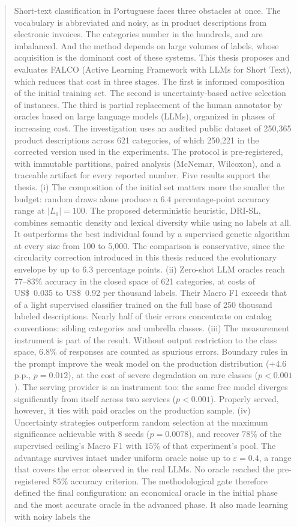 \begin{abstract}

Short-text classification in Portuguese faces three obstacles at once. The vocabulary is abbreviated and noisy, as in product descriptions from electronic invoices. The categories number in the hundreds, and are imbalanced. And the method depends on large volumes of labels, whose acquisition is the dominant cost of these systems. This thesis proposes and evaluates FALCO (Active Learning Framework with LLMs for Short Text), which reduces that cost in three stages. The first is informed composition of the initial training set. The second is uncertainty-based active selection of instances. The third is partial replacement of the human annotator by oracles based on large language models (LLMs), organized in phases of increasing cost. The investigation uses an audited public dataset of 250,365 product descriptions across 621 categories, of which 250,221 in the corrected version used in the experiments. The protocol is pre-registered, with immutable partitions, paired analysis (McNemar, Wilcoxon), and a traceable artifact for every reported number. Five results support the thesis. (i) The composition of the initial set matters more the smaller the budget: random draws alone produce a $6.4$ percentage-point accuracy range at $|L_0|=100$. The proposed deterministic heuristic, DRI-SL, combines semantic density and lexical diversity while using no labels at all. It outperforms the best individual found by a supervised genetic algorithm at every size from 100 to 5,000. The comparison is conservative, since the circularity correction introduced in this thesis reduced the evolutionary envelope by up to $6.3$ percentage points. (ii) Zero-shot LLM oracles reach $77$--$83\%$ accuracy in the closed space of 621 categories, at costs of US\$~0.035 to US\$~0.92 per thousand labels. Their Macro F1 exceeds that of a light supervised classifier trained on the full base of 250 thousand labeled descriptions. Nearly half of their errors concentrate on catalog conventions: sibling categories and umbrella classes. (iii) The measurement instrument is part of the result. Without output restriction to the class space, $6.8\%$ of responses are counted as spurious errors. Boundary rules in the prompt improve the weak model on the production distribution ($+4.6$ p.p., $p=0.012$), at the cost of severe degradation on rare classes ($p<0.001$). The serving provider is an instrument too: the same free model diverges significantly from itself across two services ($p<0.001$). Properly served, however, it ties with paid oracles on the production sample. (iv) Uncertainty strategies outperform random selection at the maximum significance achievable with 8 seeds ($p=0.0078$), and recover $78\%$ of the supervised ceiling's Macro F1 with $15\%$ of that experiment's pool. The advantage survives intact under uniform oracle noise up to $\varepsilon=0.4$, a range that covers the error observed in the real LLMs. No oracle reached the pre-registered $85\%$ accuracy criterion. The methodological gate therefore defined the final configuration: an economical oracle in the initial phase and the most accurate oracle in the advanced phase. It also made learning with noisy labels the 
\end{abstract}
